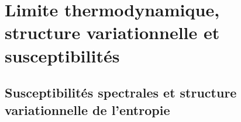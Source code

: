 %
%
%
%



\section{Limite thermodynamique, structure variationnelle et susceptibilités}

\subsection{Susceptibilités spectrales et structure variationnelle de l’entropie}

